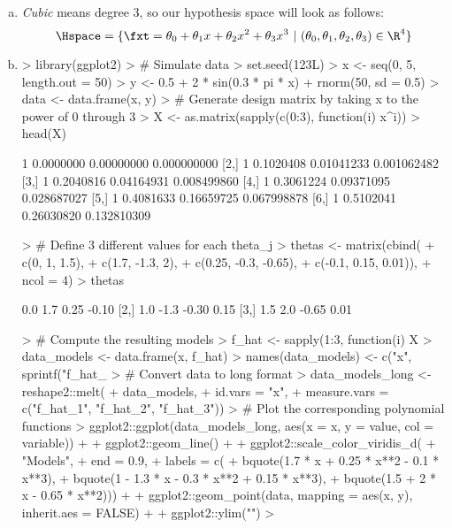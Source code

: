 \begin{enumerate}[a)]

  \item \textit{Cubic} means degree 3, so our hypothesis space will look as 
  follows:
  $$\Hspace = \{ \fxt = \theta_0 + \theta_1 x + \theta_2 x^2 + \theta_3 x^3 
  ~|~ (\theta_0, \theta_1, \theta_2, \theta_3) \in \R^4 \}$$

  \item   
\begin{Schunk}
\begin{Sinput}
> library(ggplot2)
> # Simulate data
> set.seed(123L)
> x <- seq(0, 5, length.out = 50)
> y <- 0.5 + 2 * sin(0.3 * pi * x) + rnorm(50, sd = 0.5)
> data <- data.frame(x, y)
> # Generate design matrix by taking x to the power of 0 through 3
> X <- as.matrix(sapply(c(0:3), function(i) x^i))
> head(X)
\end{Sinput}
\begin{Soutput}
     [,1]      [,2]       [,3]        [,4]
[1,]    1 0.0000000 0.00000000 0.000000000
[2,]    1 0.1020408 0.01041233 0.001062482
[3,]    1 0.2040816 0.04164931 0.008499860
[4,]    1 0.3061224 0.09371095 0.028687027
[5,]    1 0.4081633 0.16659725 0.067998878
[6,]    1 0.5102041 0.26030820 0.132810309
\end{Soutput}
\begin{Sinput}
> # Define 3 different values for each theta_j
> thetas <- matrix(cbind(
+   c(0, 1, 1.5),
+   c(1.7, -1.3, 2),
+   c(0.25, -0.3, -0.65),
+   c(-0.1, 0.15, 0.01)),
+   ncol = 4)
> thetas
\end{Sinput}
\begin{Soutput}
     [,1] [,2]  [,3]  [,4]
[1,]  0.0  1.7  0.25 -0.10
[2,]  1.0 -1.3 -0.30  0.15
[3,]  1.5  2.0 -0.65  0.01
\end{Soutput}
\begin{Sinput}
> # Compute the resulting models
> f_hat <- sapply(1:3, function(i) X %*% thetas[i, ])
> data_models <- data.frame(x, f_hat)
> names(data_models) <- c("x", sprintf("f_hat_%i", 1:3))
> # Convert data to long format
> data_models_long <- reshape2::melt(
+   data_models, 
+   id.vars = "x", 
+   measure.vars = c("f_hat_1", "f_hat_2", "f_hat_3"))
> # Plot the corresponding polynomial functions
> ggplot2::ggplot(data_models_long, aes(x = x, y = value, col = variable)) +
+   ggplot2::geom_line() +
+   ggplot2::scale_color_viridis_d(
+     "Models",
+     end = 0.9, 
+     labels = c(
+       bquote(1.7 * x + 0.25 * x**2 - 0.1 * x**3),
+       bquote(1 - 1.3 * x - 0.3 * x**2 + 0.15 * x**3),
+       bquote(1.5 + 2 * x - 0.65 * x**2))) +
+   ggplot2::geom_point(data, mapping = aes(x, y), inherit.aes = FALSE) +
+   ggplot2::ylim("")
> 
\end{Sinput}
\end{Schunk}
  
\end{enumerate}
